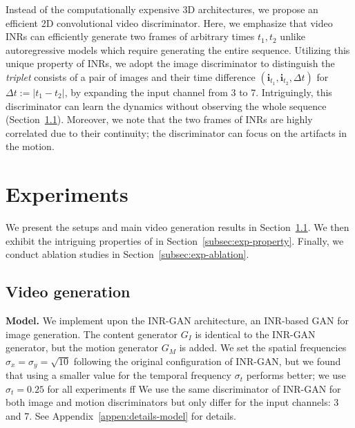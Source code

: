 \documentclass{article} \usepackage{iclr2022_conference,times}
\begin{document}
Instead of the computationally expensive 3D architectures, we propose an efficient 2D convolutional
video discriminator. Here, we emphasize that video INRs can efficiently generate two frames of arbitrary times $t_1, t_2$ unlike autoregressive models which require generating the entire sequence. Utilizing this unique property of INRs, we adopt the image discriminator to distinguish the \emph{triplet} consists of a pair of images and their time difference $(\mathbf{i}_{t_1}, \mathbf{i}_{t_2}, \Delta t)$ for $\Delta t := |t_1 - t_2|$, by expanding the input channel from 3 to 7. Intriguingly, this discriminator can learn the dynamics without observing the whole sequence (Section~\ref{subsec:exp-main}). 
Moreover, we note that the two frames of INRs are highly correlated due to their continuity; the discriminator can focus on the artifacts in the motion.

\section{Experiments}
\label{sec:exp}

We present the setups and main video generation results in Section~\ref{subsec:exp-main}. We then exhibit the intriguing properties of \sname in Section~\ref{subsec:exp-property}. Finally, we conduct ablation studies in Section~\ref{subsec:exp-ablation}.

\subsection{Video generation}
\label{subsec:exp-main}

\textbf{Model.}
We implement \sname upon the INR-GAN \citep{skorokhodov2021adversarial} architecture, an INR-based GAN for image generation. The content generator $G_I$ is identical to the INR-GAN generator, but the motion generator $G_M$ is added. We set the spatial frequencies $\sigma_x = \sigma_y = \sqrt{10}$ following the original configuration of INR-GAN, but we found that using a smaller value for the temporal frequency $\sigma_t$ performs better; we use $\sigma_t = 0.25$ for all experiments ff We use the same discriminator of INR-GAN for both image and motion discriminators but only differ for the input channels: 3 and 7. See Appendix~\ref{appen:details-model} for details.
\end{document}
